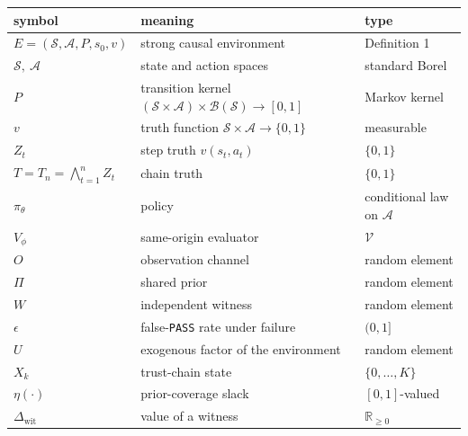 \documentclass[11pt,a4paper]{article}
\newcounter{none}
\begin{document}
{\def\LTcaptype{none} %
\begin{longtable}[]{@{}
  >{\raggedright\arraybackslash}p{}
  >{\raggedright\arraybackslash}p{}
  >{\raggedright\arraybackslash}p{}@{}}
\toprule\noalign{}
\begin{minipage}[b]{\linewidth}\raggedright
symbol
\end{minipage} & \begin{minipage}[b]{\linewidth}\raggedright
meaning
\end{minipage} & \begin{minipage}[b]{\linewidth}\raggedright
type
\end{minipage} \\
\midrule\noalign{}
\endhead
\bottomrule\noalign{}
\endlastfoot
\(E=(\mathcal S,\mathcal A,P,s_0,v)\) & strong causal environment & Definition 1 \\
\(\mathcal S,\ \mathcal A\) & state and action spaces & standard Borel \\
\(P\) & transition kernel \((\mathcal S\times\mathcal A)\times\mathcal B(\mathcal S)\to[0,1]\) & Markov kernel \\
\(v\) & truth function \(\mathcal S\times\mathcal A\to\{0,1\}\) & measurable \\
\(Z_t\) & step truth \(v(s_t,a_t)\) & \(\{0,1\}\) \\
\(T=T_n=\bigwedge_{t=1}^{n}Z_t\) & chain truth & \(\{0,1\}\) \\
\(\pi_\theta\) & policy & conditional law on \(\mathcal A\) \\
\(V_\phi\) & same-origin evaluator & \(\mathcal V\) \\
\(O\) & observation channel & random element \\
\(\Pi\) & shared prior & random element \\
\(W\) & independent witness & random element \\
\(\epsilon\) & false-\texttt{PASS} rate under failure & \((0,1]\) \\
\(U\) & exogenous factor of the environment & random element \\
\(X_k\) & trust-chain state & \(\{0,\dots,K\}\) \\
\(\eta(\cdot)\) & prior-coverage slack & \([0,1]\)-valued \\
\(\Delta_{\mathrm{wit}}\) & value of a witness & \(\mathbb R_{\ge0}\) \\
\end{longtable}
}
\end{document}
